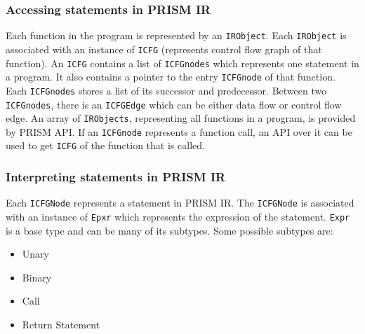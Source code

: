\documentclass[11pt,a4paper,openright]{report}
\begin{document}
% 
% 
% 
% 
% 
% 
% 
% 
%      



\subsubsection{Accessing statements in PRISM IR}
Each function in the program is represented by an \texttt{IRObject}. Each \texttt{IRObject} is associated with an instance of \texttt{ICFG} (represents control flow graph of that function).
An \texttt{ICFG} contains a list of \texttt{ICFGnodes} which represents one statement in a program. It also contains a pointer to the entry \texttt{ICFGnode} of that function.
Each \texttt{ICFGnodes} stores a list of its successor and predecessor. Between two \texttt{ICFGnodes}, there is an \texttt{ICFGEdge} which can be either data flow or
control flow edge. An array of \texttt{IRObjects}, representing all functions in a program, is provided by PRISM API. If an \texttt{ICFGnode} represents a
function call, an API over it can be used to get \texttt{ICFG} of the function that is called.

\subsubsection{Interpreting statements in PRISM IR}
Each \texttt{ICFGNode} represents a statement in PRISM IR. The \texttt{ICFGNode} is associated with an instance of \texttt{Epxr} which represents the expression of the 
statement. \texttt{Expr} is a base type and can be many of its subtypes. Some possible subtypes are: 
\begin{itemize}
 \item Unary
 \item Binary
 \item Call
 \item Return Statement
\end{itemize}
\end{document}
